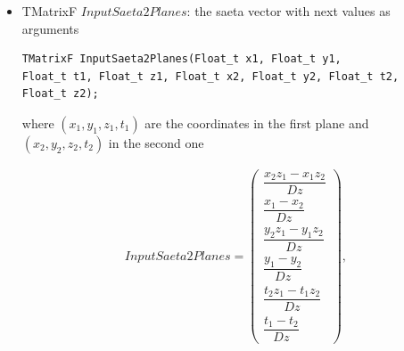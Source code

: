 \documentclass[a4paper]{book}
\begin{document}
\begin{itemize}
	\item TMatrixF $InputSaeta2Planes$: the saeta vector with next values as arguments
	
	\begin{lstlisting}
TMatrixF InputSaeta2Planes(Float_t x1, Float_t y1, 
Float_t t1, Float_t z1, Float_t x2, Float_t y2, Float_t t2, 
Float_t z2);
	\end{lstlisting}
	
	where $(x_1, y_1, z_1, t_1)$ are the coordinates in the first plane and $(x_2, y_2, z_2, t_2)$ in the second one
	
	
	\begin{align*}
	InputSaeta2Planes = \left(
	\begin{array}{c}
	 \dfrac{x_2 z_1-x_1 z_2}{Dz}\\
	 \dfrac{x_1-x_2}{Dz} \\
	 \dfrac{y_2 z_1-y_1 z_2}{Dz} \\
	 \dfrac{y_1-y_2}{Dz} \\
	 \dfrac{t_2 z_1-t_1 z_2}{Dz} \\
	 \dfrac{t_1-t_2}{Dz}
	\end{array} \right),
	\end{align*}
	

\end{itemize}
\end{document}
